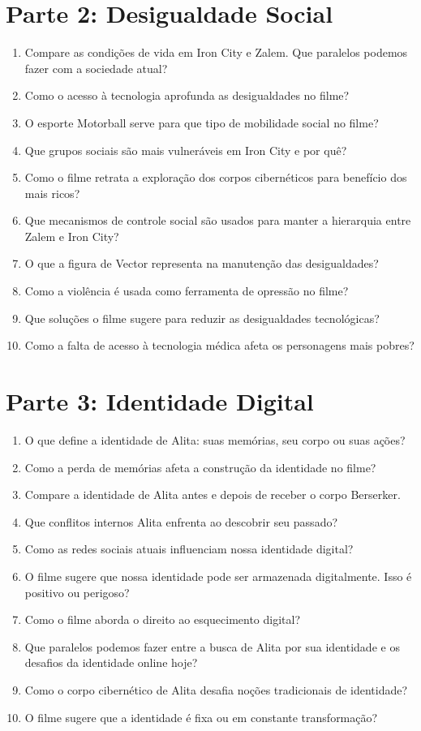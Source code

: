 \documentclass[12pt]{article}
\begin{document}
\begin{multicols}{2}
\section*{Parte 2: Desigualdade Social}
\begin{enumerate}[resume]
    \item Compare as condições de vida em Iron City e Zalem. Que paralelos podemos fazer com a sociedade atual?
    \item Como o acesso à tecnologia aprofunda as desigualdades no filme?
    \item O esporte Motorball serve para que tipo de mobilidade social no filme?
    \item Que grupos sociais são mais vulneráveis em Iron City e por quê?
    \item Como o filme retrata a exploração dos corpos cibernéticos para benefício dos mais ricos?
    \item Que mecanismos de controle social são usados para manter a hierarquia entre Zalem e Iron City?
    \item O que a figura de Vector representa na manutenção das desigualdades?
    \item Como a violência é usada como ferramenta de opressão no filme?
    \item Que soluções o filme sugere para reduzir as desigualdades tecnológicas?
    \item Como a falta de acesso à tecnologia médica afeta os personagens mais pobres?
\end{enumerate}

\section*{Parte 3: Identidade Digital}
\begin{enumerate}[resume]
    \item O que define a identidade de Alita: suas memórias, seu corpo ou suas ações?
    \item Como a perda de memórias afeta a construção da identidade no filme?
    \item Compare a identidade de Alita antes e depois de receber o corpo Berserker.
    \item Que conflitos internos Alita enfrenta ao descobrir seu passado?
    \item Como as redes sociais atuais influenciam nossa identidade digital?
    \item O filme sugere que nossa identidade pode ser armazenada digitalmente. Isso é positivo ou perigoso?
    \item Como o filme aborda o direito ao esquecimento digital?
    \item Que paralelos podemos fazer entre a busca de Alita por sua identidade e os desafios da identidade online hoje?
    \item Como o corpo cibernético de Alita desafia noções tradicionais de identidade?
    \item O filme sugere que a identidade é fixa ou em constante transformação?
\end{enumerate}

\end{multicols}
\end{document}
